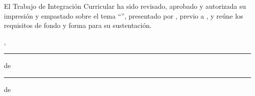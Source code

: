 
El Trabajo de Integración Curricular ha sido revisado, aprobado y autorizada su impresión y empastado sobre el tema ``\UTITituloProyectoMayusculas'', presentado por \UTIAutoresTexto, previo a \UTIFraseObtencionTituloProfesional{}, y reúne los requisitos de fondo y forma para su sustentación.

\vspace{1.5cm}
\UTICiudadPais, \rule{1.2cm}{0.4pt} de \rule{1.2cm}{0.4pt} de \UTIAnio
\vspace{2.5cm}

\UTILectoresFirmaBloque